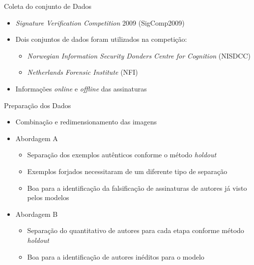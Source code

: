 \begin{frame}{Coleta do conjunto de Dados}
  \baselineskip
  \begin{itemize}
    \item \emph{Signature Verification Competition} 2009 (SigComp2009)
    \item Dois conjuntos de dados foram utilizados na competição:
    \begin{itemize}
      \item \emph{Norwegian Information Security Donders Centre for Cognition} (NISDCC)
      \item \emph{Netherlands Forensic Institute} (NFI)
    \end{itemize}
    \item Informações \emph{online} e \emph{offline} das assinaturas
  \end{itemize}

  \begin{table}[h!]
\centering
\caption{Quantitativo de indivíduos e assinaturas \emph{offline} por conjunto de dados.}
\label{tab:demonstracao-dataset}
\end{table}
\end{frame}

\begin{frame}{Preparação dos Dados}
  \baselineskip
  \begin{itemize}
    \item Combinação e redimensionamento das imagens
    \bigskip
    \item Abordagem A
    \begin{itemize}
      \item Separação dos exemplos \alert{autênticos} conforme o método \emph{holdout}
      \item Exemplos \alert{forjados} necessitaram de um diferente tipo de separação
      \item Boa para a identificação da falsificação de assinaturas de autores já visto pelos modelos
    \end{itemize}
    \bigskip
    \item Abordagem B
    \begin{itemize}
      \item Separação do \alert{quantitativo de autores} para cada etapa conforme método \emph{holdout}
      \item Boa para a identificação de autores inéditos para o modelo
    \end{itemize}
  \end{itemize}
\end{frame}

